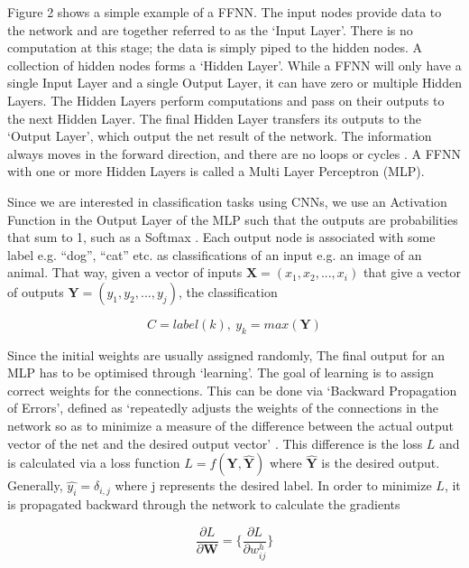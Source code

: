 \documentclass[11pt]{article}
\begin{document}
Figure 2 shows a simple example of a FFNN. The input nodes provide data to the network and are together referred to as the `Input Layer'. There is no computation at this stage; the data is simply piped to the hidden nodes. A collection of hidden nodes forms a `Hidden Layer'. While a FFNN will only have a single Input Layer and a single Output Layer, it can have zero or multiple Hidden Layers. The Hidden Layers perform computations and pass on their outputs to the next Hidden Layer. The final Hidden Layer transfers its outputs to the `Output Layer', which output the net result of the network. The information always moves in the forward direction, and there are no loops or cycles \cite{zell}. A FFNN with one or more Hidden Layers is called a Multi Layer Perceptron (MLP).\newline

Since we are interested in classification tasks using CNNs, we use an Activation Function in the Output Layer of the MLP such that the outputs are probabilities that sum to 1, such as a Softmax \cite{stanford}. Each output node is associated with some label e.g. ``dog'', ``cat'' etc. as classifications of an input e.g. an image of an animal. That way, given a vector of inputs $\bm{X} = (x_1, x_2, ... , x_i)$ that give a vector of outputs $\bm{Y} = (y_1, y_2, ... , y_j)$, the classification 

\begin{equation}
C = label(k),\ y_k = max(\bm{Y})
\end{equation}    

Since the initial weights are usually assigned randomly, The final output for an MLP has to be optimised through `learning'. The goal of learning is to assign correct weights for the connections. This can be done via `Backward Propagation of Errors', defined as `repeatedly adjusts the weights of the connections in the network so as to minimize a measure of the difference between the actual output vector of the net and the desired output vector' \cite{backprop}. This difference is the loss $L$ and is calculated via a loss function $L = f(\bm{Y}, \bm{\hat{Y}})$ where $\bm{\hat{Y}}$ is the desired output. Generally, $\hat{y_i} = \delta_{i,j}$ where j represents the desired label. In order to minimize $L$, it is propagated backward through the network to calculate the gradients 

\begin{equation}
\frac{\partial L}{\partial \bm{W}} = \{\frac{\partial L}{\partial w^{h}_{ij}}\}
\end{equation}
\end{document}
